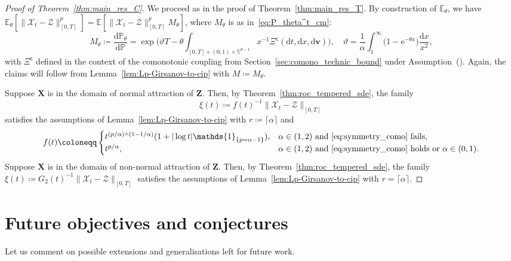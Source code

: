 \documentclass[en,oneside,bbfont,article]{amsart}
\theoremstyle{remark}
\theoremstyle{definition}
\theoremstyle{definition}
\newcommand\X{\bm{\mathcal{X}}}
\newcommand\ZZ{\bm{\mathcal{Z}}}
\newcommand\Sp{\mathbb{S}}
\newcommand\E{\mathds{E}}
\newcommand\e{\mathord{\mathrm{e}}}
\newcommand\p{\mathds{P}}
\newcommand\1{\mathds{1}}
\renewcommand\ge{\geqslant}
\newcommand\co{\mathsf{c}}
\newcommand{\D}{\mathrm{d}}
\begin{document}
\begin{proof}[Proof of Theorem~\ref{thm:main_res_C}]
We proceed as in the proof of Theorem~\ref{thm:main_res_T}. By construction of $\E_\theta$, we have
$\E_\theta[\|\X_t-\ZZ\|_{[0,T]}^p] = \E[\|\X_t-\ZZ\|_{[0,T]}^p M_\theta]$, where $M_\theta$ is as in~\eqref{eq:P_theta^t_cm}: 
\begin{equation}\label{eq:M_theta_como}
M_\theta \coloneqq \frac{\D\p_\theta}{\D\p}=\exp\bigg(\vartheta T-\theta\int_{[0,T]\times (0,1)\times \Sp^{d-1}} x^{-1} \Xi^\co(\D t, \D x,\D\bm{v})\bigg), 
\quad
\vartheta = \frac{1}{\alpha}\int_1^\infty \big(1-\e^{-\theta x} \big)  \frac{\D x}{x^2},
\end{equation} 
with $\Xi^\co$ defined in the context of the comonotonic coupling from Section~\ref{sec:comono_technic_bound} under Assumption~(). Again, the claims will follow from Lemma~\ref{lem:Lp-Girsanov-to-cip} with $M\coloneqq M_\theta$.

Suppose $\bm{X}$ is in the domain of normal attraction of $\bm{Z}$. Then, by Theorem~\ref{thm:roc_tempered_sde}, the family 
\[
\xi(t)\coloneqq f(t)^{-1} 
\|\X_t-\ZZ\|_{[0,T]}
\]
satisfies the assumptions of Lemma~\ref{lem:Lp-Girsanov-to-cip} with $r\coloneqq\lceil\alpha\rceil$ and 
\[
f(t)
\coloneqq 
\begin{cases}
t^{%
(p/\alpha)\wedge(1-1/\alpha)}(1+|\log t|\1_{\{p=\alpha-1\}%
}),
&\alpha\in(1,2)\text{ and \eqref{eq:symmetry_como} fails},\\
t^{%
p/\alpha },
&\alpha\in(1,2)\text{ and \eqref{eq:symmetry_como} holds or }\alpha\in(0,1).
\end{cases}
\]
Suppose $\bm{X}$ is in the domain of non-normal attraction of $\bm{Z}$. Then, by Theorem~\ref{thm:roc_tempered_sde}, the family $\xi(t)\coloneqq G_2(t)^{-1}\|\X_t-\ZZ\|_{[0,T]}$ satisfies the assumptions of Lemma~\ref{lem:Lp-Girsanov-to-cip} with $r=\lceil\alpha\rceil$.
\end{proof}



\section{Future objectives and conjectures}
\label{sec:conclusion}

Let us comment on possible extensions and generalisations left for future work.
\end{document}
